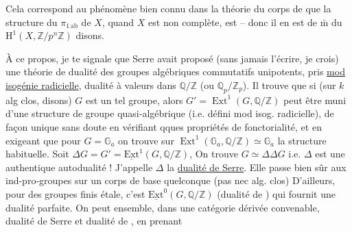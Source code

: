 Cela correspond au phénomène bien connu dans la théorie du corps de  que la structure du $\pi_{1\,\mathrm{ab}}$ de $X$, quand $X$ est non complète, est \uline{} -- donc il en est de $\bar{\mathrm m}$ du $\mathrm{H}^{1}(X,\mathbb{Z}/p^{n}\mathbb{Z})$ disons.

À ce propos, je te signale que Serre avait proposé (sans jamais l'écrire, je crois) une théorie de dualité des groupes algébriques commutatifs unipotents,  pris \uline{mod isogénie radicielle}, dualité à valeurs dans $\mathbb{Q}/\mathbb{Z}$ (ou $\mathbb{Q}_p/\mathbb{Z}_p$). Il trouve que si (sur $k$ alg clos, disons) $G$ est un tel groupe, alors $G'=\operatorname{Ext}^{1}(G,\mathbb{Q}/\mathbb{Z})$ peut être muni  d'une structure de groupe quasi-algébrique (i.e. défini mod isog. radicielle), de façon unique sans doute en vérifiant qques propriétés de fonctorialité, et en exigeant que pour $G=\mathbb{G}_a$ on trouve sur $\operatorname{Ext}^{1}(\mathbb{G}_a,\mathbb{Q}/\mathbb{Z})\simeq\mathbb{G}_a$ la structure habituelle. Soit $\Delta G=G'=\underline{\mathrm{Ext}}^{1}(G,\mathbb{Q}/\mathbb{Z})$, On trouve $G\simeq\Delta\Delta G$ i.e. $\Delta$ est une authentique autodualité ! J'appelle $\Delta$ la \uline{dualité de Serre}. Elle passe bien sûr aux ind-pro-groupes sur un corps de base quelconque (pas nec alg. clos)  D'ailleurs, pour des groupes finis étale, c'est $\underline{\mathrm{Ext}}^{0}(G,\mathbb{Q}/\mathbb{Z})$ (dualité de ) qui fournit une dualité parfaite. On peut  ensemble, dans une catégorie dérivée convenable, dualité de Serre et dualité de , en prenant

